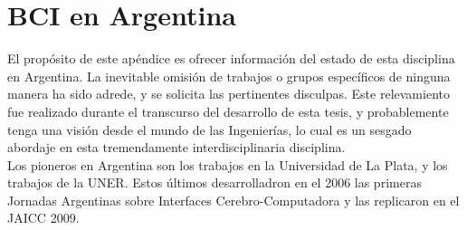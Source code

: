 \chapter{BCI en Argentina}
\label{chapter:ten}

El propósito de este apéndice es ofrecer información del estado de esta disciplina en Argentina.  La inevitable omisión de trabajos o grupos específicos de ninguna manera ha sido adrede, y se solicita las pertinentes disculpas.  Este relevamiento fue realizado durante el transcurso del desarrollo de esta tesis, y probablemente tenga una visión desde el mundo de las Ingenierías, lo cual es un sesgado abordaje en esta tremendamente interdisciplinaria disciplina. \\

Los pioneros en Argentina son los trabajos en la Universidad de La Plata, y los trabajos de la UNER.  Estos últimos desarrolladron en el 2006 las primeras Jornadas Argentinas sobre Interfaces Cerebro-Computadora y las replicaron en el JAICC 2009. \\

